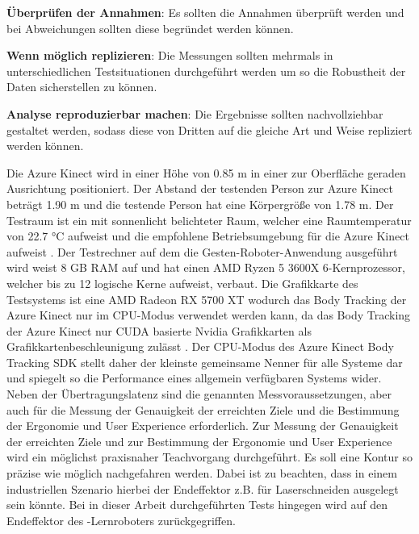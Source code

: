 \begin{compact_enumerate}
    \item \textbf{Überprüfen der Annahmen}: Es sollten die Annahmen überprüft werden und bei Abweichungen sollten diese begründet werden können.
    \item \textbf{Wenn möglich replizieren}: Die Messungen sollten mehrmals in unterschiedlichen Testsituationen durchgeführt werden um so die Robustheit der Daten sicherstellen zu können.
    \item \textbf{Analyse reproduzierbar machen}: Die Ergebnisse sollten nachvollziehbar gestaltet werden, sodass diese von Dritten auf die gleiche Art und Weise repliziert werden können.
\end{compact_enumerate}

Die Azure Kinect wird in einer Höhe von \num{0,85} m in einer zur Oberfläche geraden Ausrichtung positioniert. Der Abstand der testenden Person zur Azure Kinect beträgt \num{1,90} m und die testende Person hat eine Körpergröße von \num{1,78} m. Der Testraum ist ein mit sonnenlicht belichteter Raum, welcher eine Raumtemperatur von \num{22,7} °C aufweist und die empfohlene Betriebsumgebung für die Azure Kinect aufweist \cite{tesych_azure_nodate}. Der Testrechner auf dem die Gesten-Roboter-Anwendung ausgeführt wird weist 8 GB RAM auf und hat einen AMD Ryzen 5 3600X 6-Kernprozessor, welcher bis zu 12 logische Kerne aufweist, verbaut. Die Grafikkarte des Testsystems ist eine AMD Radeon RX 5700 XT wodurch das Body Tracking der Azure Kinect nur im CPU-Modus verwendet werden kann, da das Body Tracking der Azure Kinect nur CUDA basierte Nvidia Grafikkarten als Grafikkartenbeschleunigung zulässt \cite{encausse_body_nodate}. Der CPU-Modus des Azure Kinect Body Tracking SDK stellt daher der kleinste gemeinsame Nenner für alle Systeme dar und spiegelt so die Performance eines allgemein verfügbaren Systems wider.\\

Neben der Übertragungslatenz sind die genannten Messvoraussetzungen, aber auch für die Messung der Genauigkeit der erreichten Ziele und die Bestimmung der Ergonomie und User Experience erforderlich. Zur Messung der Genauigkeit der erreichten Ziele und zur Bestimmung der Ergonomie und User Experience wird ein möglichst praxisnaher Teachvorgang durchgeführt. Es soll eine Kontur so präzise wie möglich nachgefahren werden. Dabei ist zu beachten, dass in einem industriellen Szenario hierbei der Endeffektor z.B. für Laserschneiden ausgelegt sein könnte. Bei in dieser Arbeit durchgeführten Tests hingegen wird auf den Endeffektor des -Lernroboters zurückgegriffen.

